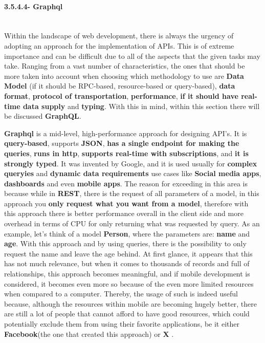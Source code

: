 \paragraph{3.5.4.4- Graphql}\mbox{}\\
Within the landscape of web development, there is always the urgency of adopting an approach for the implementation of APIs. This is of 
extreme importance and can be difficult due to all of the aspects that the given tasks may take. Ranging from a vast number of 
characteristics, the ones that should be more taken into account when choosing which methodology to use are \textbf{Data Model} 
(if it should be RPC-based, resource-based or query-based), \textbf{data format}, \textbf{protocol of transportation}, \textbf{performance}, 
\textbf{if it should have real-time data supply} and \textbf{typing}. With this in mind, within this section there will be discussed 
\textbf{GraphQL}.

\textbf{Graphql} is a mid-level, high-performance approach for designing API's. It is \textbf{query-based}, 
supports \textbf{JSON}, \textbf{has a single endpoint for making the queries}, \textbf{runs in http}, 
\textbf{supports real-time with subscriptions}, and \textbf{it is strongly typed}. It was invented by Google, and it is used usually 
for \textbf{complex queryies} and \textbf{dynamic data requirements} use cases like \textbf{Social media apps}, \textbf{dashboards} and 
even \textbf{mobile apps}. The reason for exceeding in this area is because while in \textbf{REST}, there is the request of all parameters 
of a model, in this approach you \textbf{only request what you want from a model}, therefore with this approach there is better 
performance overall in the client side and more overhead in terms of CPU for only returning what was requested by query. As an example, 
let's think of a model \textbf{Person}, where the parameters are: \textbf{name} and \textbf{age}. With this approach and by using queries, 
there is the possibility to only request the name and leave the age behind. At first glance, it appears that this has not much relevance, 
but when it comes to thousands of records and full of relationships, this approach becomes meaningful, and if mobile development is 
considered, it becomes even more so because of the even more limited resources when compared to a computer. Thereby, the usage of such is 
indeed useful because, although the resources within mobile are becoming hugely better, there are still a lot of people that cannot 
afford to have good resources, which could potentially exclude them from using their favorite applications, 
be it either \textbf{Facebook}(the one that created this approach) or \textbf{X} \cite{graphql}\cite{graphql2}\cite{graphql3}.

